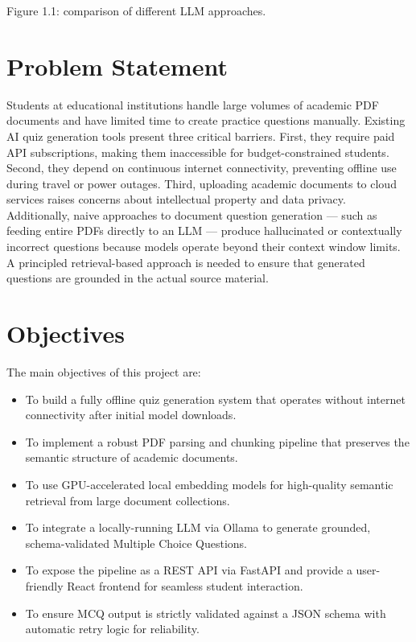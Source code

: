 \documentclass[12pt,a4paper]{report}
\begin{document}
Figure 1.1: comparison of different LLM approaches.
\section{Problem Statement}
Students at educational institutions handle large volumes of academic PDF documents and have limited time to create practice questions manually. Existing AI quiz generation tools present three critical barriers. First, they require paid API subscriptions, making them inaccessible for budget-constrained students. Second, they depend on continuous internet connectivity, preventing offline use during travel or power outages. Third, uploading academic documents to cloud services raises concerns about intellectual property and data privacy.
Additionally, naive approaches to document question generation — such as feeding entire PDFs directly to an LLM — produce hallucinated or contextually incorrect questions because models operate beyond their context window limits. A principled retrieval-based approach is needed to ensure that generated questions are grounded in the actual source material.
\section{Objectives}
The main objectives of this project are:
\begin{itemize}
\item To build a fully offline quiz generation system that operates without internet connectivity after initial model downloads.
\item To implement a robust PDF parsing and chunking pipeline that preserves the semantic structure of academic documents.
\item To use GPU-accelerated local embedding models for high-quality semantic retrieval from large document collections.
\item To integrate a locally-running LLM via Ollama to generate grounded, schema-validated Multiple Choice Questions.
\item To expose the pipeline as a REST API via FastAPI and provide a user-friendly React frontend for seamless student interaction.
\item To ensure MCQ output is strictly validated against a JSON schema with automatic retry logic for reliability.
\end{itemize}
\end{document}
